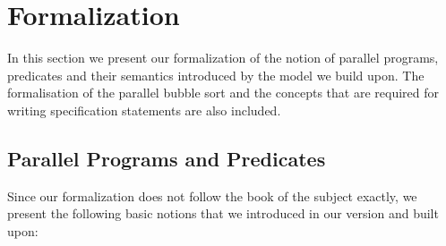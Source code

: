 \section{Formalization}

In this section we present our formalization of the notion of parallel programs, predicates and their semantics introduced by the model we build upon. The formalisation of the parallel bubble sort and the concepts that are required for writing specification statements are also included.

\subsection{Parallel Programs and Predicates}

Since our formalization does not follow the book of the subject exactly, we present the following basic notions that we introduced in our version and built upon:
